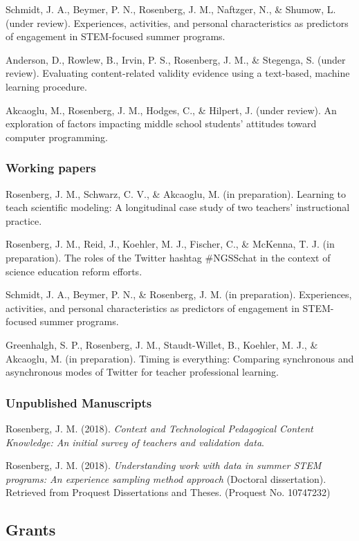 \documentclass[14,]{article}
\begin{document}
Schmidt, J. A., Beymer, P. N., Rosenberg, J. M., Naftzger, N., \&
Shumow, L. (under review). Experiences, activities, and personal
characteristics as predictors of engagement in STEM-focused summer
programs.

Anderson, D., Rowlew, B., Irvin, P. S., Rosenberg, J. M., \& Stegenga,
S. (under review). Evaluating content-related validity evidence using a
text-based, machine learning procedure.

Akcaoglu, M., Rosenberg, J. M., Hodges, C., \& Hilpert, J. (under
review). An exploration of factors impacting middle school students'
attitudes toward computer programming.

\subsubsection{Working papers}\label{working-papers}

Rosenberg, J. M., Schwarz, C. V., \& Akcaoglu, M. (in preparation).
Learning to teach scientific modeling: A longitudinal case study of two
teachers' instructional practice.

Rosenberg, J. M., Reid, J., Koehler, M. J., Fischer, C., \& McKenna, T.
J. (in preparation). The roles of the Twitter hashtag \#NGSSchat in the
context of science education reform efforts.

Schmidt, J. A., Beymer, P. N., \& Rosenberg, J. M. (in preparation).
Experiences, activities, and personal characteristics as predictors of
engagement in STEM-focused summer programs.

Greenhalgh, S. P., Rosenberg, J. M., Staudt-Willet, B., Koehler, M. J.,
\& Akcaoglu, M. (in preparation). Timing is everything: Comparing
synchronous and asynchronous modes of Twitter for teacher professional
learning.

\subsubsection{Unpublished Manuscripts}\label{unpublished-manuscripts}

Rosenberg, J. M. (2018). \emph{Context and Technological Pedagogical
Content Knowledge: An initial survey of teachers and validation data}.

Rosenberg, J. M. (2018). \emph{Understanding work with data in summer
STEM programs: An experience sampling method approach} (Doctoral
dissertation). Retrieved from Proquest Dissertations and Theses.
(Proquest No. 10747232)

\subsection{Grants}\label{grants}
\end{document}
